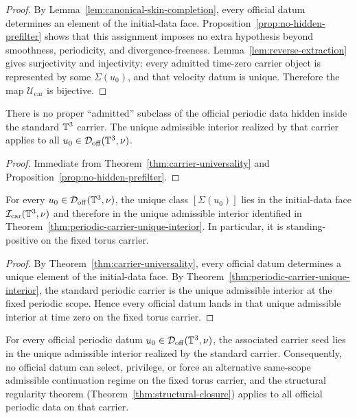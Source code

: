\begin{proof}
By Lemma~\ref{lem:canonical-skin-completion}, every official datum determines an element of the
initial-data face. Proposition~\ref{prop:no-hidden-prefilter} shows that this assignment imposes no
extra hypothesis beyond smoothness, periodicity, and divergence-freeness. Lemma~\ref{lem:reverse-extraction}
gives surjectivity and injectivity: every admitted time-zero carrier object is represented by some
$\Sigma(u_0)$, and that velocity datum is unique. Therefore the map $\mathcal U_{\mathrm{car}}$ is
bijective.
\end{proof}

\begin{corollary}\label{cor:no-smaller-admissible-subclass}
There is no proper ``admitted'' subclass of the official periodic data hidden inside the standard
$\mathbb{T}^3$ carrier. The unique admissible interior realized by that carrier applies to all
$u_0\in\mathcal D_{\mathrm{off}}(\mathbb{T}^3,\nu)$.
\end{corollary}

\begin{proof}
Immediate from Theorem~\ref{thm:carrier-universality} and Proposition~\ref{prop:no-hidden-prefilter}.
\end{proof}

\begin{corollary}\label{cor:every-official-datum-admitted}
For every $u_0\in\mathcal D_{\mathrm{off}}(\mathbb{T}^3,\nu)$, the unique class $[\Sigma(u_0)]$ lies in the
initial-data face $\mathcal I_{\mathrm{car}}(\mathbb{T}^3,\nu)$ and therefore in the unique admissible interior
identified in Theorem~\ref{thm:periodic-carrier-unique-interior}. In particular, it is
standing-positive on the fixed torus carrier.
\end{corollary}

\begin{proof}
By Theorem~\ref{thm:carrier-universality}, every official datum determines a unique element of the
initial-data face. By Theorem~\ref{thm:periodic-carrier-unique-interior}, the standard periodic
carrier is the unique admissible interior at the fixed periodic scope. Hence every official datum
lands in that unique admissible interior at time zero on the fixed torus carrier.
\end{proof}

\begin{corollary}\label{cor:universality-upgrade}
For every official periodic datum $u_0\in\mathcal D_{\mathrm{off}}(\mathbb{T}^3,\nu)$, the associated
carrier seed lies in the unique admissible interior realized by the standard carrier. Consequently,
no official datum can select, privilege, or force an alternative same-scope admissible continuation
regime on the fixed torus carrier, and the structural regularity theorem
(Theorem~\ref{thm:structural-closure}) applies to all official periodic data on that carrier.
\end{corollary}


